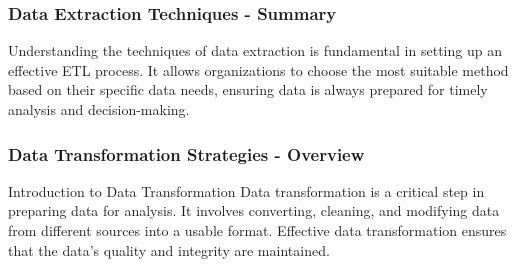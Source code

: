 \documentclass[aspectratio=169]{beamer}
\begin{document}
\begin{frame}[fragile]
    \frametitle{Data Extraction Techniques - Summary}
    Understanding the techniques of data extraction is fundamental in setting up an effective ETL process. It allows organizations to choose the most suitable method based on their specific data needs, ensuring data is always prepared for timely analysis and decision-making.
\end{frame}

\begin{frame}[fragile]
    \frametitle{Data Transformation Strategies - Overview}
    \begin{block}{Introduction to Data Transformation}
        Data transformation is a critical step in preparing data for analysis. It involves converting, cleaning, and modifying data from different sources into a usable format. Effective data transformation ensures that the data's quality and integrity are maintained.
    \end{block}
\end{frame}
\end{document}
